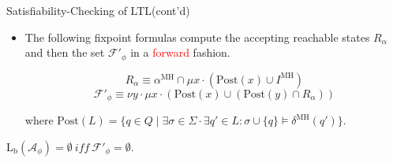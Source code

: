 \documentclass[12pt]{beamer}
\begin{document}
\begin{frame}{Satisfiability-Checking of LTL(cont'd)}
	\begin{itemize}
		\item The following fixpoint formulas compute the accepting reachable states $R_{\alpha}$ and then the set $\mathcal{F}'_{\phi}$ in a \textcolor{red}{forward} fashion.

		$$R_{\alpha} \equiv \alpha^{\text{MH}} \cap \mu x \cdot (\text{Post}(x) \cup I^{\text{MH}})$$
		$$\mathcal{F}'_{\phi} \equiv \nu y \cdot \mu x \cdot (\text{Post}(x) \cup (\text{Post}(y) \cap R_{\alpha})) $$
		
		where $\text{Post}(L) = \{q \in Q \mid \exists \sigma \in \Sigma \cdot \exists q' \in L : \sigma \cup \{q\} \models \delta^{\text{MH}}(q')\}$.
	\end{itemize}
	\begin{theorem}
		$\text{L}_{\text{b}}(\mathcal{A}_{\phi}) = \emptyset ~ iff ~ \mathcal{F}'_{\phi} = \emptyset$.
	\end{theorem}
\end{frame}
\end{document}
